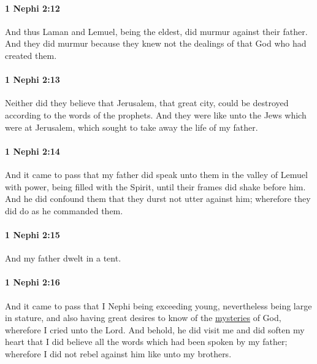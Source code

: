 		\paragraph{1 Nephi 2:12} %
			\label{1NEPHI-2-12}

			And thus Laman and Lemuel, being the eldest,
			did murmur against their father.
			And they did murmur because they knew not
			the dealings of that God who had created them.

		\paragraph{1 Nephi 2:13} %
			\label{1NEPHI-2-13}

			Neither did they believe that Jerusalem, that great city,
			could be destroyed according to the words of the prophets.
			And they were like unto the Jews which were at Jerusalem,
			which sought to take away the life of my father.

		\paragraph{1 Nephi 2:14} %
			\label{1NEPHI-2-14}

			And it came to pass that my father did speak unto them
			in the valley of Lemuel with power, being filled with the Spirit,
			until their frames did shake before him.
			And he did confound them that they durst not utter against him;
			wherefore they did do as he commanded them.

		\paragraph{1 Nephi 2:15} %
			\label{1NEPHI-2-15}

			And my father dwelt in a tent.

		\paragraph{1 Nephi 2:16} %
			\label{1NEPHI-2-16}

			And it came to pass that I Nephi being exceeding young,
			nevertheless being large in stature,
			and also having great desires to know of the \hyperref[MYSTERY]{mysteries} of God,
			wherefore I cried unto the Lord.
			And behold, he did visit me and did soften my heart
			that I did believe all the words which had been spoken by my father;
			wherefore I did not rebel against him like unto my brothers.

